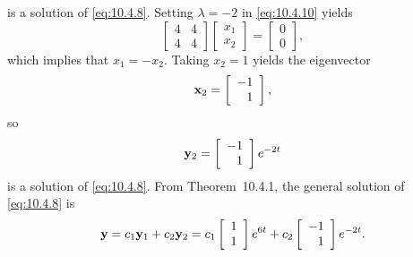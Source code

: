 \begin{examplesolution}
\[\]
is a solution of \eqref{eq:10.4.8}. Setting $\lambda=-2$ in \eqref{eq:10.4.10} yields
\[
  \left[
  \begin{array}{rr}
    4 & 4 \\
    4 & 4
  \end{array}\right] \left[
  \begin{array}{c}
    x_{1} \\
    x_{2}
  \end{array}\right]=\left[
  \begin{array}{c}
    0 \\
    0
  \end{array}\right],
\]
which implies that $x_{1}=-x_{2}$. Taking $x_{2}=1$ yields the eigenvector
\[
  {\bf x}_{2}=\left[
  \begin{array}{r}
    -1 \\
    1
  \end{array}\right],
\]
so
\[
  {\bf y}_{2}=\left[
  \begin{array}{r}
    -1 \\
    1
  \end{array}
  \right]e^{-2t}
\]
is a solution of \eqref{eq:10.4.8}. From Theorem~10.4.1, the general solution of
\eqref{eq:10.4.8} is
\begin{equation}
  \label{eq:10.4.11}{\bf y}=c_{1}{\bf y}_{1}+c_{2}{\bf y}_{2}=c_{1}\left[
  \begin{array}{r}
    1 \\
    1
  \end{array}\right]e^{6t}+c_{2}\left[
  \begin{array}{r}
    -1 \\
    1
  \end{array}\right]e^{-2t}.
\end{equation}


\end{examplesolution}
